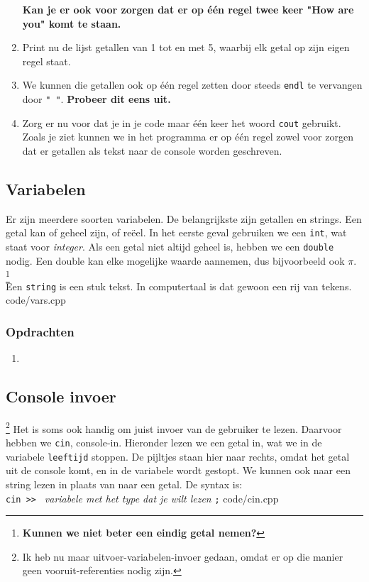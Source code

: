 \documentclass[12pt,a4paper]{article}
\newcommand{\code}{}
\newcommand{\icode}{\lstinline}
\begin{document}
\begin{enumerate}
			\textbf{Kan je er ook voor zorgen dat er op \'e\'en regel twee keer "How are you" komt te staan.} 
		\item
			Print nu de lijst getallen van 1 tot en met 5, waarbij elk getal op zijn eigen regel staat.
		\item
			We kunnen die getallen ook op \'e\'en regel zetten door steeds \icode{endl} te vervangen door \icode{" "}. \textbf{Probeer dit eens uit.}
		\item
			Zorg er nu voor dat je in je code maar \'e\'en keer het woord \icode{cout} gebruikt.
			Zoals je ziet kunnen we in het programma er op \'e\'en regel zowel voor zorgen dat er getallen als tekst naar de console worden geschreven. 
\end{enumerate}

\subsection{Variabelen}
Er zijn meerdere soorten variabelen. De belangrijkste zijn getallen en strings. Een getal kan of geheel zijn, of re\"eel. In het eerste geval gebruiken we een \icode{int}, wat staat voor \emph{integer}. Als een getal niet altijd geheel is, hebben we een \icode{double} nodig. Een double kan elke mogelijke waarde aannemen, dus bijvoorbeeld ook $\pi$. \footnote{\textbf{Kunnen we niet beter een eindig getal nemen?}}\\
Een \icode{string} is een stuk tekst. In computertaal is dat gewoon een rij van tekens.
\code{code/vars.cpp}
\subsubsection{Opdrachten}
\begin{enumerate}
		\item
\end{enumerate}


\subsection{Console invoer}\footnote{Ik heb nu maar uitvoer-variabelen-invoer gedaan, omdat er op die manier geen vooruit-referenties nodig zijn.}
Het is soms ook handig om juist invoer van de gebruiker te lezen. Daarvoor hebben we \icode{cin}, console-in. Hieronder lezen we een getal in, wat we in de variabele \icode{leeftijd} stoppen. De pijltjes staan hier naar rechts, omdat het getal uit de console komt, en in de variabele wordt gestopt. We kunnen ook naar een string lezen in plaats van naar een getal. De syntax is: \\
\icode{cin >> } \emph{variabele met het type dat je wilt lezen} \icode{;}
\code{code/cin.cpp}
\end{document}
